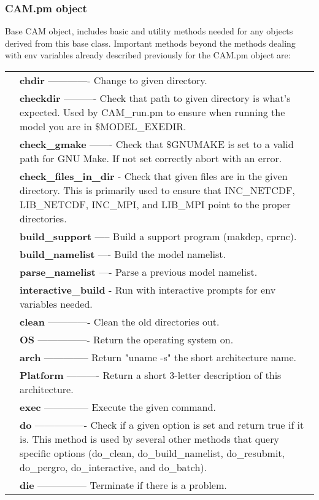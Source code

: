 \documentclass[]{article}
\begin{document}
\subsubsection{CAM.pm object}
Base CAM object, includes basic and utility methods needed for any objects derived from
this base class. Important methods beyond the methods dealing with env variables already
described previously for the CAM.pm object are:\\
\begin{tabular}{r p{3.7in}}
	& {\bf chdir} ------------- Change to given directory. \\
	& {\bf checkdir} ---------- Check that path to given directory is what's expected. Used
			by CAM\_run.pm to ensure when running the model you are in \$MODEL\_EXEDIR.\\
       & {\bf check\_gmake} ------- Check that \$GNUMAKE is set to a valid path for GNU Make.
			If not set correctly abort with an error.\\
       & {\bf check\_files\_in\_dir} - Check that given files are in the given directory. This
                     is primarily used to ensure that INC\_NETCDF, LIB\_NETCDF, INC\_MPI, 
			and LIB\_MPI point to the proper directories. \\
	& {\bf build\_support} ----- Build a support program (makdep, cprnc). \\
	& {\bf build\_namelist} ---- Build the model namelist.\\
	& {\bf parse\_namelist} ---- Parse a previous model namelist.\\
	& {\bf interactive\_build} - Run with interactive prompts for env variables needed.\\
	& {\bf clean} ------------- Clean the old directories out. \\
	& {\bf OS} ---------------- Return the operating system on.\\
	& {\bf arch} -------------- Return "uname -s" the short architecture name.\\
	& {\bf Platform} ---------- Return a short 3-letter description of this architecture.\\
	& {\bf exec} -------------- Execute the given command.\\
	& {\bf do} ---------------- Check if a given option is set and return true if it is. This
				method is used by several other methods that query specific options
				(do\_clean, do\_build\_namelist, do\_resubmit, do\_pergro, 
                            do\_interactive, and do\_batch).\\
	& {\bf die} --------------- Terminate if there is a problem.
\end{tabular}
\end{document}
